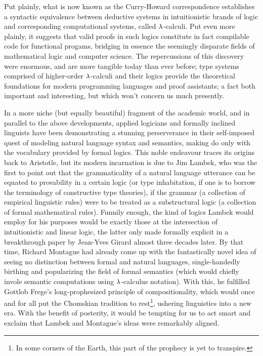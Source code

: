 Put plainly, what is now known as the Curry-Howard correspondence establishes a syntactic equivalence between deductive systems in intuitionistic brands of logic and corresponding computational systems, called $\mathnormal{\lambda}$-calculi.
Put even more plainly, it suggests that valid proofs in such logics constitute in fact compilable code for functional progams, bridging in essence the seemingly disparate fields of mathematical logic and computer science.
The repercussions of this discovery were enormous, and are more tangible today than ever before; type systems comprised of higher-order $\mathnormal{\lambda}$-calculi and their logics provide the theoretical foundations for modern programming languages and proof assistants; 
a fact both important and interesting, but which won't concern us much presently.

In a more niche (but equally beautiful) fragment of the academic world, and in parallel to the above developments, applied logicians and formally inclined linguists have been demonstrating a stunning perserverance in their self-imposed quest of modeling natural language syntax and semantics, making do only with the vocabulary provided by formal logics.
This noble endeavour traces its origins back to Aristotle, but its modern incarnation is due to Jim Lambek, who was the first to point out that the grammaticality of a natural language utterance can be equated to provability in a certain logic (or type inhabitation, if one is to borrow the terminology of constructive type theories), if the grammar (a collection of empirical linguistic rules) were to be treated as a substructural logic (a collection of formal mathematical rules).
Funnily enough, the kind of logics Lambek would employ for his purposes would be exactly those at the intersection of intuitionistic and linear logic, the latter only made formally explicit in a breakthrough paper by Jean-Yves Girard almost three decades later.
By that time, Richard Montague had already come up with the fantastically novel idea of seeing no distinction between formal and natural languages, single-handedly birthing and popularizing the field of formal semantics (which would chiefly invole semantic computations using $\mathnormal{\lambda}$-calculus notation).
With this, he fulfilled Gottlob Frege's long-prophesized principle of compositionality, which would once and for all put the Chomskian tradition to rest\footnote{In some corners of the Earth, this part of the prophecy is yet to transpire.}, ushering linguistics into a new era.
With the benefit of posterity, it would be tempting for us to act smart and exclaim that Lambek and Montague's ideas were remarkably aligned. 
